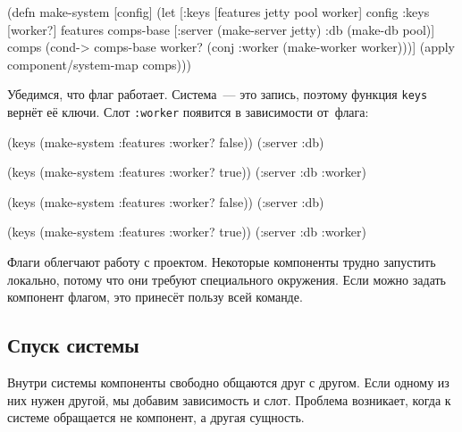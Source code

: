 \else

\begin{english}
  \begin{clojure}
(defn make-system [config]
  (let [{:keys [features jetty pool worker]} config
        {:keys [worker?]} features
        comps-base [:server (make-server jetty)
                    :db (make-db pool)]
        comps (cond-> comps-base
                worker?
                (conj :worker (make-worker worker)))]
    (apply component/system-map comps)))
  \end{clojure}
\end{english}

\fi

Убедимся, что флаг работает. Система~--- это запись, поэтому функция \verb|keys|
вернёт её ключи. Слот \verb|:worker| появится в зависимости от~флага:

\ifnarrow

\begin{english}
  \begin{clojure}
(keys (make-system
        {:features {:worker? false}}))
(:server :db)

(keys (make-system
        {:features {:worker? true}}))
(:server :db :worker)
  \end{clojure}
\end{english}

\else

\begin{english}
  \begin{clojure}
(keys (make-system {:features {:worker? false}}))
(:server :db)

(keys (make-system {:features {:worker? true}}))
(:server :db :worker)
  \end{clojure}
\end{english}

\fi

Флаги облегчают работу с проектом. Некоторые компоненты трудно запустить
локально, потому что они требуют специального окружения. Если можно задать
компонент флагом, это принесёт пользу всей команде.

\subsection{Спуск системы}


Внутри системы компоненты свободно общаются друг с другом. Если одному из них
нужен другой, мы добавим зависимость и слот. Проблема возникает, когда к системе
обращается не компонент, а другая сущность.

